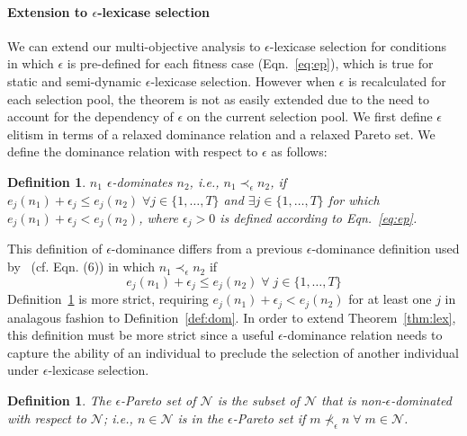 \documentclass[twoside]{article}
\newtheorem{defn}[lex]{Definition}
\begin{document}
\paragraph{Extension to $\epsilon$-lexicase selection}
We can extend our multi-objective analysis to $\epsilon$-lexicase selection for conditions in which $\epsilon$ is pre-defined for each fitness case  (Eqn.~\ref{eq:ep}), which is true for static and semi-dynamic $\epsilon$-lexicase selection. However when $\epsilon$ is recalculated for each selection pool, the theorem is not as easily extended due to the need to account for the dependency of $\epsilon$ on the current selection pool. We first define $\epsilon$ elitism in terms of a relaxed dominance relation and a relaxed Pareto set. We define the dominance relation with respect to $\epsilon$ as follows:


\begin{defn}\label{def:edom}
$n_1$ {\it $\epsilon$-dominates} $n_2$, i.e., ${n_1} \prec_{\epsilon} {n_2}$, if $e_j(n_1) + \epsilon_j \leq e_j(n_2)  \;
\forall j  \in \{1,\dots,T\}$ and $\exists j \in \{1,\dots,T\}$ for which $e_j(n_1) + \epsilon_j < e_j(n_2) $, where $\epsilon_j>0$ is defined according to Eqn.~\ref{eq:ep}.
\end{defn}


This definition of $\epsilon$-dominance differs from a previous $\epsilon$-dominance definition used by~\cite{laumanns_archiving_2002} (cf. Eqn. (6)) in which ${n_1} \prec_{\epsilon} {n_2}$ if \[ e_j(n_1) + \epsilon_j \leq e_j(n_2) \; \forall \; j  \in \{1,\dots,T\}\] 
Definition~\ref{def:edom} is more strict, requiring $e_j(n_1) + \epsilon_j < e_j(n_2)$ for at least one $j$ in analagous fashion to Definition~\ref{def:dom}.  In order to extend Theorem~\ref{thm:lex}, this definition must be more strict since a useful $\epsilon$-dominance relation needs to capture the ability of an individual to preclude the selection of another individual under $\epsilon$-lexicase selection. 
 
\begin{defn}\label{def:epset}
The {\it $\epsilon$-Pareto set} of $\mathcal{N}$ is the subset of $\mathcal{N}$ that is non-$\epsilon$-dominated with respect to $\mathcal{N}$; i.e., $n \in \mathcal{N}$ is in the $\epsilon$-Pareto set if $m \nprec_{\epsilon} n \; \forall \; m \in \mathcal{N}$. 
\end{defn}
\end{document}

